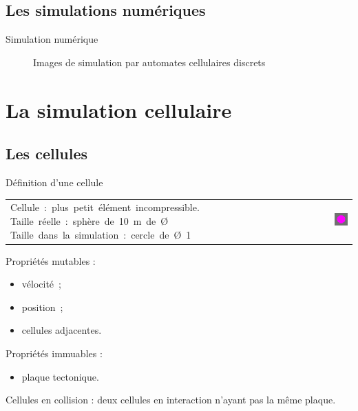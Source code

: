 \documentclass{beamer}
\begin{document}
\subsection{Les simulations numériques}
\begin{frame}{Simulation numérique}
  \begin{center}
    \begin{figure}
      \caption{Images de simulation par automates cellulaires discrets}
    \end{figure}
  \end{center}
\end{frame}

\section{La simulation cellulaire}

\subsection{Les cellules}
\begin{frame}{Définition d'une cellule}
  \begin{tabular}{m{8cm}m{1cm}m{2cm}}
    \mbox{Cellule : plus petit élément incompressible.}
    \mbox{Taille réelle : sphère de 10 m de Ø}
    \mbox{Taille dans la simulation : cercle de Ø 1} &&
    \includegraphics[width=1.5cm]{Images/cellule.png}
  \end{tabular}
  Propriétés mutables :
  \begin{itemize}
   \item vélocité~;
   \item position~;
   \item cellules adjacentes.
  \end{itemize}
  Propriétés immuables :
  \begin{itemize}
   \item plaque tectonique.\\
  \end{itemize}
  \smallbreak
  Cellules en collision : deux cellules en interaction n'ayant pas la même plaque.
\end{frame}
\end{document}
